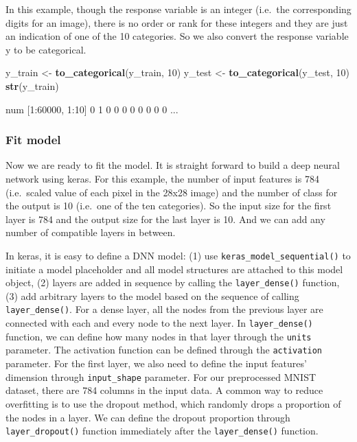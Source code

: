 \documentclass[12pt,]{krantz}
\makeatletter
\newenvironment{Shaded}{\begin{snugshade}}{\end{snugshade}}
\newcommand{\DecValTok}[1]{\textcolor[rgb]{0.06,0.06,0.06}{#1}}
\newcommand{\KeywordTok}[1]{\textcolor[rgb]{0.27,0.27,0.27}{\textbf{#1}}}
\newcommand{\NormalTok}[1]{#1}
\newcommand{\StringTok}[1]{\textcolor[rgb]{0.5,0.5,0.5}{#1}}
\newenvironment{kframe}{%
\medskip{}
\setlength{\fboxsep}{.8em}
 \def\at@end@of@kframe{}%
 \ifinner\ifhmode%
  \def\at@end@of@kframe{\end{minipage}}%
  \begin{minipage}{\columnwidth}%
 \fi\fi%
 \def\FrameCommand##1{\hskip\@totalleftmargin \hskip-\fboxsep
 \colorbox{shadecolor}{##1}\hskip-\fboxsep
     \hskip-\linewidth \hskip-\@totalleftmargin \hskip\columnwidth}%
 \MakeFramed {\advance\hsize-\width
   \@totalleftmargin\z@ \linewidth\hsize
   \@setminipage}}%
 {\par\unskip\endMakeFramed%
 \at@end@of@kframe}
\renewenvironment{Shaded}{\begin{kframe}}{\end{kframe}}
\makeatother
\begin{document}
In this example, though the response variable is an integer (i.e.~the corresponding digits for an image), there is no order or rank for these integers and they are just an indication of one of the 10 categories. So we also convert the response variable y to be categorical.

\begin{Shaded}
\begin{Highlighting}[]
\NormalTok{y_train <-}\StringTok{ }\KeywordTok{to_categorical}\NormalTok{(y_train, }\DecValTok{10}\NormalTok{)}
\NormalTok{y_test <-}\StringTok{ }\KeywordTok{to_categorical}\NormalTok{(y_test, }\DecValTok{10}\NormalTok{)}
\KeywordTok{str}\NormalTok{(y_train)}
\end{Highlighting}
\end{Shaded}

\begin{Shaded}
\begin{Highlighting}[]
\NormalTok{num [1:60000, 1:10] 0 1 0 0 0 0 0 0 0 0 ...}
\end{Highlighting}
\end{Shaded}

\hypertarget{fit-model}{%
\subsubsection{Fit model}\label{fit-model}}

Now we are ready to fit the model. It is straight forward to build a deep neural network using keras. For this example, the number of input features is 784 (i.e.~scaled value of each pixel in the 28x28 image) and the number of class for the output is 10 (i.e.~one of the ten categories). So the input size for the first layer is 784 and the output size for the last layer is 10. And we can add any number of compatible layers in between.

In keras, it is easy to define a DNN model: (1) use \texttt{keras\_model\_sequential()} to initiate a model placeholder and all model structures are attached to this model object, (2) layers are added in sequence by calling the \texttt{layer\_dense()} function, (3) add arbitrary layers to the model based on the sequence of calling \texttt{layer\_dense()}. For a dense layer, all the nodes from the previous layer are connected with each and every node to the next layer. In \texttt{layer\_dense()} function, we can define how many nodes in that layer through the \texttt{units} parameter. The activation function can be defined through the \texttt{activation} parameter. For the first layer, we also need to define the input features' dimension through \texttt{input\_shape} parameter. For our preprocessed MNIST dataset, there are 784 columns in the input data. A common way to reduce overfitting is to use the dropout method, which randomly drops a proportion of the nodes in a layer. We can define the dropout proportion through \texttt{layer\_dropout()} function immediately after the \texttt{layer\_dense()} function.
\end{document}
